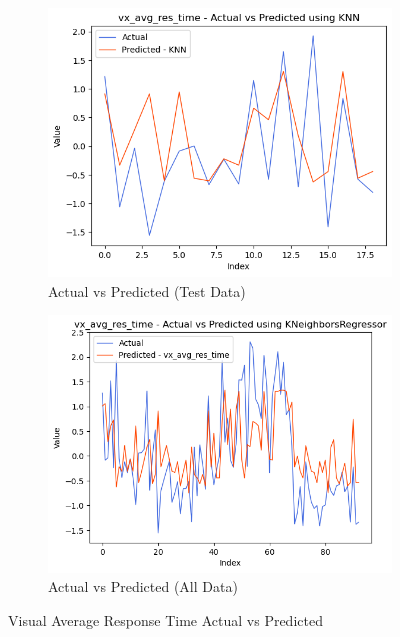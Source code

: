 \begin{figure}[htbp]
    \centering
    \begin{subfigure}[b]{0.49\textwidth}
        \centering
        \includegraphics[width=\textwidth]{images/charts/test_data_visual_average_response_time.png}
        \caption{Actual vs Predicted (Test Data)}
        \label{fig:actual_vs_predicted_vx_avg_res_time_test}
    \end{subfigure}\hfill
    \begin{subfigure}[b]{0.49\textwidth}
        \centering
        \includegraphics[width=\textwidth]{images/charts/all_data_visual_average_response_time.png}
        \caption{Actual vs Predicted (All Data)}
        \label{fig:actual_vs_predicted_vx_avg_res_time_all_data}
    \end{subfigure}
    \caption{Visual Average Response Time Actual vs Predicted}
    \label{fig:visual_avg_response_time_comparison}
\end{figure}

